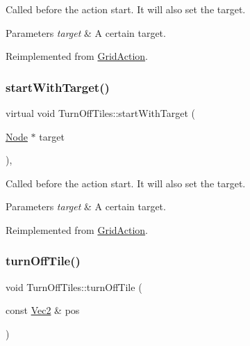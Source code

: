 Called before the action start. It will also set the target.


\begin{DoxyParams}{Parameters}
{\em target} & A certain target. \\
\hline
\end{DoxyParams}


Reimplemented from \hyperlink{classGridAction_a33e2c1bc95bbcf6b16428097b4fd4b61}{Grid\+Action}.

\mbox{\label{classTurnOffTiles_adb571aa2b12a065bb9cd94fe2c1f9eb0}} 
\subsubsection{\texorpdfstring{start\+With\+Target()}{startWithTarget()}\hspace{0.1cm}{\footnotesize\ttfamily [2/2]}}
{\footnotesize\ttfamily virtual void Turn\+Off\+Tiles\+::start\+With\+Target (\begin{DoxyParamCaption}\item[{\hyperlink{classNode}{Node} $\ast$}]{target }\end{DoxyParamCaption})\hspace{0.3cm}{\ttfamily [override]}, {\ttfamily [virtual]}}

Called before the action start. It will also set the target.


\begin{DoxyParams}{Parameters}
{\em target} & A certain target. \\
\hline
\end{DoxyParams}


Reimplemented from \hyperlink{classGridAction_a33e2c1bc95bbcf6b16428097b4fd4b61}{Grid\+Action}.

\mbox{\label{classTurnOffTiles_acf0d94735c46519fe4b301accd43a715}} 
\subsubsection{\texorpdfstring{turn\+Off\+Tile()}{turnOffTile()}\hspace{0.1cm}{\footnotesize\ttfamily [1/2]}}
{\footnotesize\ttfamily void Turn\+Off\+Tiles\+::turn\+Off\+Tile (\begin{DoxyParamCaption}\item[{const \hyperlink{classVec2}{Vec2} \&}]{pos }\end{DoxyParamCaption})}



